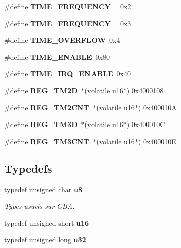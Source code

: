 \begin{DoxyCompactItemize}
\item 
\#define {\bfseries TIME\_\-FREQUENCY\_}~0x2\label{main_8h_a0519a9509ef094331a53cea201060da3}

\item 
\#define {\bfseries TIME\_\-FREQUENCY\_}~0x3\label{main_8h_a243c2eff2513382b53f9d88766ebc10c}

\item 
\#define {\bfseries TIME\_\-OVERFLOW}~0x4\label{main_8h_afe2ebbc12798ce2274289a678e2d2007}

\item 
\#define {\bfseries TIME\_\-ENABLE}~0x80\label{main_8h_ab83862a991f12f384630b6a1f1a66068}

\item 
\#define {\bfseries TIME\_\-IRQ\_\-ENABLE}~0x40\label{main_8h_a25a111ec9475b7175950a32a43d14b54}

\item 
\#define {\bfseries REG\_\-TM2D}~$\ast$(volatile u16$\ast$) 0x4000108\label{main_8h_addeefd9e702badc8a29d3a8f017181a4}

\item 
\#define {\bfseries REG\_\-TM2CNT}~$\ast$(volatile u16$\ast$) 0x400010A\label{main_8h_a82097351000ce29b5b7d56175c0032bf}

\item 
\#define {\bfseries REG\_\-TM3D}~$\ast$(volatile u16$\ast$) 0x400010C\label{main_8h_a4fe56d5cbcc81b615ca9495310f7f5cb}

\item 
\#define {\bfseries REG\_\-TM3CNT}~$\ast$(volatile u16$\ast$) 0x400010E\label{main_8h_a232988998c9f87cea01dc100bd4d30cd}

\end{DoxyCompactItemize}
\subsection*{Typedefs}
\begin{DoxyCompactItemize}
\item 
typedef unsigned char {\bf u8}\label{main_8h_aed742c436da53c1080638ce6ef7d13de}

\begin{DoxyCompactList}\small\item\em Types usuels sur GBA. \item\end{DoxyCompactList}\item 
typedef unsigned short {\bfseries u16}\label{main_8h_a9e6c91d77e24643b888dbd1a1a590054}

\item 
typedef unsigned long {\bfseries u32}\label{main_8h_a2caf5cd7bcdbe1eefa727f44ffb10bac}

\end{DoxyCompactItemize}
